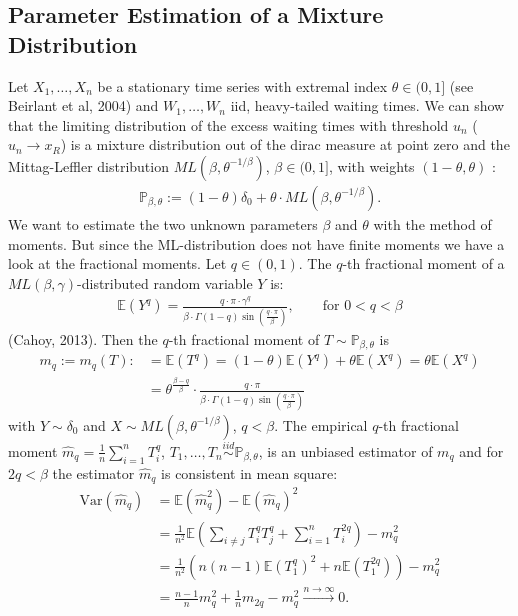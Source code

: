 \documentclass[10pt, a4paper]{article}\usepackage[]{graphicx}\usepackage[]{color}
\begin{document}
	
	



\subsection*{Parameter Estimation of a Mixture Distribution}
Let $X_1,\dots,X_n$ be a stationary time series with extremal index $\theta\in (0,1]$ (see Beirlant et al, 2004) and $W_1,\dots,W_n$ iid, heavy-tailed waiting times. We can show that the limiting distribution of the excess waiting times with threshold $u_n$ ($u_n \rightarrow x_R$) is a mixture distribution out of the dirac measure at point zero and the Mittag-Leffler distribution $ML(\beta,\theta^{-1/\beta})$, $\beta \in (0,1]$, with weights $(1-\theta,\theta)$ :
\begin{align} \label{eq3}
	\mathbb{P}_{\beta,\theta}:=(1-\theta)\delta_0+\theta \cdot ML(\beta,\theta^{-1/\beta}).
\end{align}
We want to estimate the two unknown parameters $\beta$ and $\theta$ with the method of moments. But since the ML-distribution does not have finite moments we have a look at the fractional moments. Let $q \in (0,1)$. The $q$-th fractional moment of a $ML(\beta,\gamma)$-distributed random variable $Y$ is:
\begin{align}
\mathbb{E}(Y^q)=\frac{ q \cdot \pi \cdot  \gamma^q}{\beta \cdot \Gamma(1-q)\sin(\frac{q \cdot \pi}{\beta})}, \qquad \text{for } 0 < q < \beta
\end{align}
(Cahoy, 2013). 
Then the $q$-th fractional moment of $T \sim \mathbb{P}_{\beta,\theta}$ is
\begin{align} \label{eq1}
m_q:=m_q(T):&=\mathbb{E}(T^q) = (1-\theta)\mathbb{E}(Y^q)+\theta\mathbb{E}(X^q) = \theta\mathbb{E}(X^q) \\
&= \theta^{\frac{\beta-q}{\beta}} \cdot \frac{ q \cdot \pi  }{\beta \cdot \Gamma(1-q)\sin(\frac{q \cdot \pi}{\beta})} \nonumber
\end{align}
with $Y \sim \delta_0$ and $X \sim ML(\beta,\theta^{-1/\beta})$, $q<\beta$.
The empirical $q$-th fractional moment $\hat{m}_q=\frac{1}{n}\sum_{i=1}^{n}T_i^q$, $T_1,\dots,T_n \overset{iid}{\sim} \mathbb{P}_{\beta,\theta}$, is an unbiased estimator of $m_q$ and for $2q < \beta$ the estimator $\hat{m}_q$ is consistent in mean square:
\begin{align}
	\text{Var}(\hat{m}_q)
	&=\mathbb{E}(\hat{m}_q^2)-\mathbb{E}(\hat{m}_q)^2 \\ \nonumber
	&= \frac{1}{n^2}\mathbb{E}\left( \sum_{i \neq j} T_i^q T_j^q + \sum_{i=1}^{n} T_i^{2q} \right) - m_q^2 \\ \nonumber
	&= \frac{1}{n^2}\left(  n(n-1) \mathbb{E}(T_1^q)^2 + n \mathbb{E}(T_1^{2q}) \right) - m_q^2 \\ \nonumber
	&= \frac{n-1}{n} m_q^2 + \frac{1}{n} m_{2q} - m_q^2 \overset{n \to \infty}{\longrightarrow} 0. 
\end{align}
\end{document}
